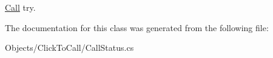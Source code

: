 \hyperlink{class_thecallr_api_1_1_objects_1_1_click_to_call_1_1_call}{Call} try. 



The documentation for this class was generated from the following file\+:\begin{DoxyCompactItemize}
\item 
Objects/\+Click\+To\+Call/Call\+Status.\+cs\end{DoxyCompactItemize}
